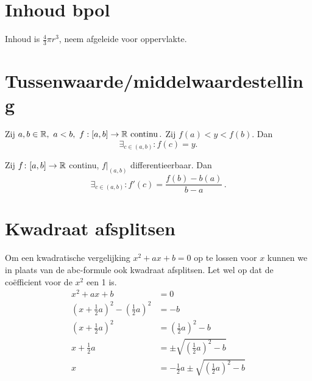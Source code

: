\documentclass{article}
\begin{document}
	\section{Inhoud bpol}\label{sec:inhoudBpol}
		Inhoud is $\frac{4}{3} \pi r^3$, neem afgeleide voor oppervlakte.

    \section{Tussenwaarde/middelwaardestelling}\label{sec:tussenwaarde/middelwaardestelling}
    \begin{stelling}

        Zij $a,b \in \mathbb{R},\ a<b,\
            f:[a,b]\to \mathbb{R} \text{ continu}\,.
        $
        Zij $f(a)<y<f(b)$.
        Dan \[ \exists_{c\in(a,b)}:f(c)=y. \]
    \end{stelling}

    \begin{stelling}

        Zij $f\colon[a,b] \to \mathbb{R}$ continu, $f|_{(a,b)}$ differentieerbaar.
        Dan
        \[
        \exists_{c \in (a,b)} : f'(c) = \frac{f(b)-b(a)}{b-a}\,.
        \]
    \end{stelling}
		
	\section{Kwadraat afsplitsen}\label{sec:kwadraatAfsplitsen}
        Om een kwadratische vergelijking $x^2 + ax + b = 0$ op te lossen voor $x$ kunnen we in plaats van de abc-formule ook kwadraat afsplitsen.
        Let wel op dat de co\"efficient voor de $x^2$ een 1 is.
        \begin{align*}
            x^2 + a x + b &= 0 \\
            \left(x + \frac{1}{2} a\right)^2 - \left( \frac{1}{2}a \right)^2 &= - b \\
            \left(x + \frac{1}{2} a\right)^2 &= \left( \frac{1}{2}a \right)^2 - b \\
            x + \frac{1}{2} a &= \pm \sqrt{\left( \frac{1}{2}a \right)^2 - b} \\
            x &= -  \frac{1}{2} a \pm \sqrt{\left(\frac{1}{2}a \right)^2 - b}
        \end{align*}

    \newpage
\end{document}
